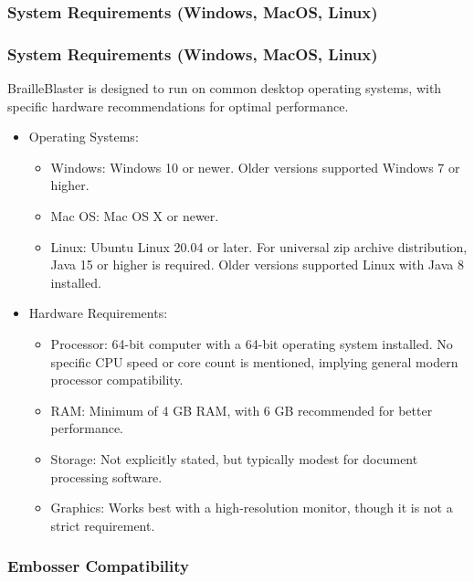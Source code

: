 \subsubsection{System Requirements (Windows, MacOS, Linux)}

\subsubsection{System Requirements (Windows, MacOS, Linux)}

BrailleBlaster is designed to run on common desktop operating systems, with specific hardware recommendations for optimal performance.

\begin{itemize}
    \item Operating Systems:
    \begin{itemize}
        \item Windows: Windows 10 or newer. \cite{SterlingAdaptivesVP} Older versions supported Windows 7 or higher. \cite{SterlingAdaptivesVP}
        \item Mac OS: Mac OS X or newer. \cite{SterlingAdaptivesVP}
        \item Linux: Ubuntu Linux 20.04 or later. For universal zip archive distribution, Java 15 or higher is required. \cite{SterlingAdaptivesVP} Older versions supported Linux with Java 8 installed. \cite{SterlingAdaptivesVP}
    \end{itemize}
    \item Hardware Requirements:
    \begin{itemize}
        \item Processor: 64-bit computer with a 64-bit operating system installed. \cite{SterlingAdaptivesVP} No specific CPU speed or core count is mentioned, implying general modern processor compatibility.
        \item RAM: Minimum of 4 GB RAM, with 6 GB recommended for better performance. \cite{SterlingAdaptivesVP}
        \item Storage: Not explicitly stated, but typically modest for document processing software.
        \item Graphics: Works best with a high-resolution monitor, though it is not a strict requirement. \cite{SterlingAdaptivesVP}
    \end{itemize}
\end{itemize}

\subsubsection{Embosser Compatibility}

